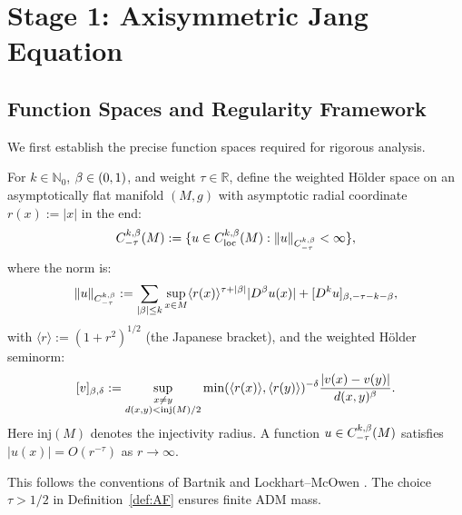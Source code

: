 \section{Stage 1: Axisymmetric Jang Equation}\label{sec:jang}

\subsection{Function Spaces and Regularity Framework}

We first establish the precise function spaces required for rigorous analysis.

\begin{definition}\label{def:weighted-holder}
For $k \in \mathbb{N}_0$, $\beta \in (0,1)$, and weight $\tau \in \mathbb{R}$, define the weighted H\"older space on an asymptotically flat manifold $(M, g)$ with asymptotic radial coordinate $r(x) := |x|$ in the end:
\[
C^{k,\beta}_{-\tau}(M) := \{u \in C^{k,\beta}_{\mathrm{loc}}(M) : \|u\|_{C^{k,\beta}_{-\tau}} < \infty\},
\]
where the norm is:
\[
\|u\|_{C^{k,\beta}_{-\tau}} := \sum_{|\beta| \leq k} \sup_{x \in M} \langle r(x)\rangle^{\tau + |\beta|}|D^\beta u(x)| + [D^k u]_{\beta, -\tau-k-\beta},
\]
with $\langle r \rangle := (1 + r^2)^{1/2}$ (the Japanese bracket), and the weighted H\"older seminorm:
\[
[v]_{\beta, \delta} := \sup_{\substack{x \neq y \\ d(x,y) < \mathrm{inj}(M)/2}} \min(\langle r(x)\rangle, \langle r(y)\rangle)^{-\delta} \frac{|v(x) - v(y)|}{d(x,y)^\beta}.
\]
Here $\mathrm{inj}(M)$ denotes the injectivity radius. A function $u \in C^{k,\beta}_{-\tau}(M)$ satisfies $|u(x)| = O(r^{-\tau})$ as $r \to \infty$.

This follows the conventions of Bartnik \cite{bartnik1986} and Lockhart--McOwen \cite{lockhartmccowen1985}. The choice $\tau > 1/2$ in Definition~\ref{def:AF} ensures finite ADM mass.
\end{definition}

